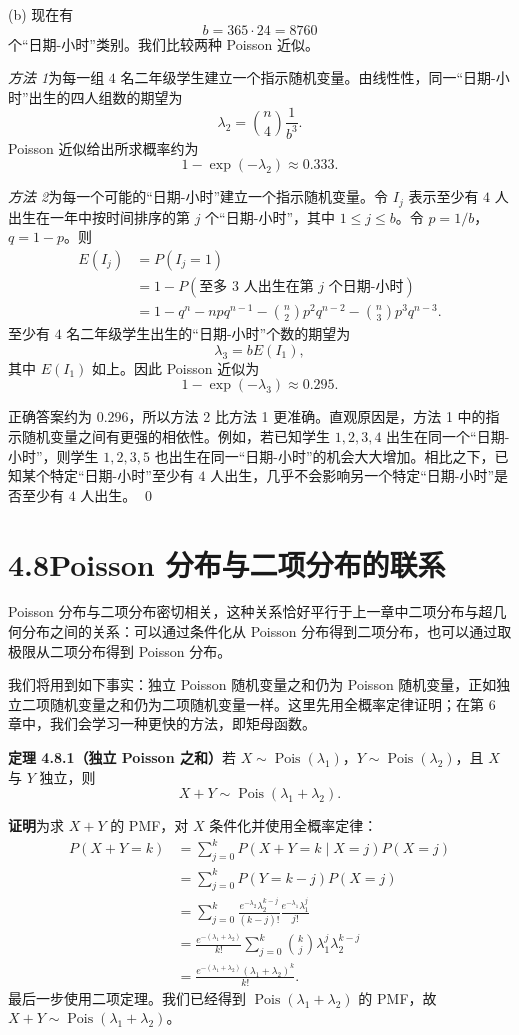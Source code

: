 \documentclass[UTF8, 12pt, fontset=fandol, oneside]{ctexart}
\begin{document}
(b) 现在有
\[
  b=365\cdot 24=8760
\]
个“日期-小时”类别。我们比较两种 Poisson 近似。

\noindent\textit{方法 1}\quad 为每一组 $4$ 名二年级学生建立一个指示随机变量。由线性性，同一“日期-小时”出生的四人组数的期望为
\[
  \lambda_2=\binom{n}{4}\frac{1}{b^3}.
\]
Poisson 近似给出所求概率约为
\[
  1-\exp(-\lambda_2)\approx 0.333.
\]

\noindent\textit{方法 2}\quad 为每一个可能的“日期-小时”建立一个指示随机变量。令 $I_j$ 表示至少有 $4$ 人出生在一年中按时间排序的第 $j$ 个“日期-小时”，其中 $1\le j\le b$。令 $p=1/b$，$q=1-p$。则
\[
\begin{aligned}
  E(I_j)&=P(I_j=1)\\
  &=1-P(\text{至多 }3\text{ 人出生在第 }j\text{ 个日期-小时})\\
  &=1-q^n-npq^{n-1}-\binom{n}{2}p^2q^{n-2}-\binom{n}{3}p^3q^{n-3}.
\end{aligned}
\]
至少有 $4$ 名二年级学生出生的“日期-小时”个数的期望为
\[
  \lambda_3=bE(I_1),
\]
其中 $E(I_1)$ 如上。因此 Poisson 近似为
\[
  1-\exp(-\lambda_3)\approx 0.295.
\]

正确答案约为 $0.296$，所以方法 2 比方法 1 更准确。直观原因是，方法 1 中的指示随机变量之间有更强的相依性。例如，若已知学生 $1,2,3,4$ 出生在同一个“日期-小时”，则学生 $1,2,3,5$ 也出生在同一“日期-小时”的机会大大增加。相比之下，已知某个特定“日期-小时”至少有 $4$ 人出生，几乎不会影响另一个特定“日期-小时”是否至少有 $4$ 人出生。 \qed

\section*{4.8\quad Poisson 分布与二项分布的联系}

Poisson 分布与二项分布密切相关，这种关系恰好平行于上一章中二项分布与超几何分布之间的关系：可以通过条件化从 Poisson 分布得到二项分布，也可以通过取极限从二项分布得到 Poisson 分布。

我们将用到如下事实：独立 Poisson 随机变量之和仍为 Poisson 随机变量，正如独立二项随机变量之和仍为二项随机变量一样。这里先用全概率定律证明；在第 6 章中，我们会学习一种更快的方法，即矩母函数。

\noindent\textbf{定理 4.8.1（独立 Poisson 之和）}\quad 若 $X\sim\operatorname{Pois}(\lambda_1)$，$Y\sim\operatorname{Pois}(\lambda_2)$，且 $X$ 与 $Y$ 独立，则
\[
  X+Y\sim\operatorname{Pois}(\lambda_1+\lambda_2).
\]

\noindent\textbf{证明}\quad 为求 $X+Y$ 的 PMF，对 $X$ 条件化并使用全概率定律：
\[
\begin{aligned}
  P(X+Y=k)
  &=\sum_{j=0}^k P(X+Y=k\mid X=j)P(X=j)\\
  &=\sum_{j=0}^k P(Y=k-j)P(X=j)\\
  &=\sum_{j=0}^k
    \frac{e^{-\lambda_2}\lambda_2^{k-j}}{(k-j)!}
    \frac{e^{-\lambda_1}\lambda_1^j}{j!}\\
  &=\frac{e^{-(\lambda_1+\lambda_2)}}{k!}
    \sum_{j=0}^k\binom{k}{j}\lambda_1^j\lambda_2^{k-j}\\
  &=\frac{e^{-(\lambda_1+\lambda_2)}(\lambda_1+\lambda_2)^k}{k!}.
\end{aligned}
\]
最后一步使用二项定理。我们已经得到 $\operatorname{Pois}(\lambda_1+\lambda_2)$ 的 PMF，故 $X+Y\sim\operatorname{Pois}(\lambda_1+\lambda_2)$。
\end{document}

